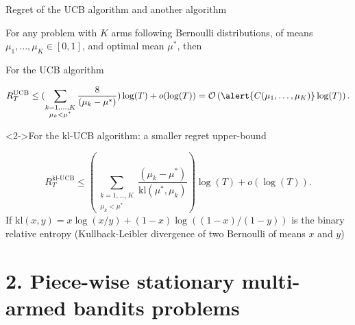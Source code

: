 \documentclass[11pt,english,ignorenonframetext,]{beamer}
\begin{document}
\begin{frame}{Regret of the UCB algorithm and another algorithm}

  For any problem with $K$ arms following Bernoulli distributions, of means $\mu_1,\dots,\mu_K \in[0,1]$, and optimal mean $\mu^*$, then

  \begin{exampleblock}{For the UCB algorithm}
    \begin{small}
      \[ R_T^{\mathrm{UCB}} \leq ( \sum_{\substack{k=1,\dots,K \\ \mu_k < \mu^*}} \frac{8}{(\mu_k - \mu^*)} ) \log(T) + o(\log(T)) = \mathcal{O}\left( \alert{C(\mu_1,\dots,\mu_K)} \log(T) \right). \]
    \end{small}%
  \end{exampleblock}

  \begin{exampleblock}<2->{For the kl-UCB algorithm: a smaller regret upper-bound}
    \begin{small}
      \[ R_T^{\mathrm{kl}\text{-}\mathrm{UCB}} \leq ( \sum_{\substack{k=1,\dots,K \\ \mu_k < \mu^*}} \frac{(\mu_k - \mu^*)}{\mathrm{kl}(\mu^*, \mu_k)} ) \log(T) + o(\log(T)). \]
      If $\mathrm{kl}(x, y) = x \log(x/y) + (1-x) \log((1-x)/(1-y))$ is the binary relative entropy (Kullback-Leibler divergence of two Bernoulli of means $x$ and $y$)
    \end{small}%
  \end{exampleblock}

\end{frame}



\section{\hfill{}2. Piece-wise stationary multi-armed bandits problems\hfill{}}
\end{document}
